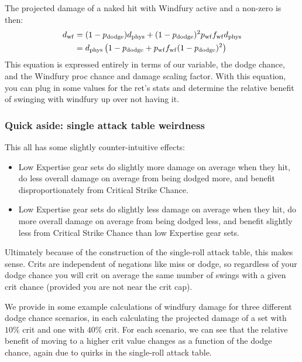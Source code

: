 The projected damage of a naked hit with Windfury active and a non-zero \pdodge is then:
\begin{equation*}
	\begin{aligned}
		d_\mathrm{wf} &= (1 - p_{\mathrm{dodge}} ) d_{\mathrm{phys}}  + (1 - p_{\mathrm{dodge}} )^2 p_{\mathrm{wf}}  f_{\mathrm{wf}}  d_{\mathrm{phys}} \\
				&= d_{\mathrm{phys}} \left(1 - p_{\mathrm{dodge}}  + p_{\mathrm{wf}} f_{\mathrm{wf}} (1 -p_{\mathrm{dodge}} )^2\right) \\
	\end{aligned}
\end{equation*}
This equation is expressed entirely in terms of our \dphys variable, the dodge chance, and the Windfury proc chance and damage scaling factor.
With this equation, you can plug in some values for the ret's stats and determine the relative benefit of swinging with windfury up over not having it.


\subsubsection{Quick aside: single attack table weirdness}
This all has some slightly counter-intuitive effects:
\begin{itemize}
	\item Low Expertise gear sets do slightly more damage on average when they hit, do less overall damage on average from being dodged more, and benefit disproportionately from Critical Strike Chance.
	\item Low Expertise gear sets do slightly less damage on average when they hit, do more overall damage on average from being dodged less, and benefit slightly less from Critical Strike Chance than low Expertise gear sets.
\end{itemize}
Ultimately because of the construction of the single-roll attack table, this makes sense.
Crits are independent of negations like miss or dodge, so regardless of your dodge chance you will crit on average the same number of swings with a given crit chance (provided you are not near the crit cap).

We provide in  some example calculations of windfury damage for three different dodge chance scenarios, in each calculating the projected damage of a set with $10\%$ crit and one with $40\%$ crit.
For each scenario, we can see that the relative benefit of moving to a higher crit value changes as a function of the dodge chance, again due to quirks in the single-roll attack table.

